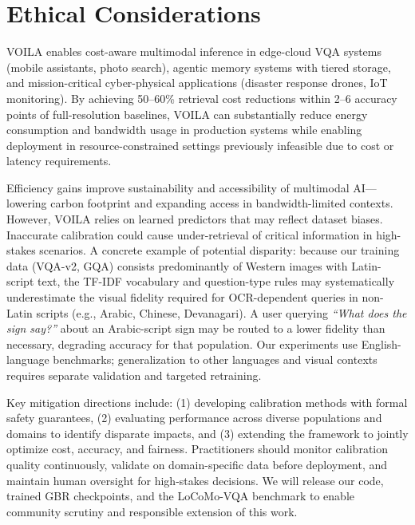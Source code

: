\section*{Ethical Considerations}

\textsc{VOILA} enables cost-aware multimodal inference in edge-cloud VQA systems (mobile assistants, photo search), agentic memory systems with tiered storage, and mission-critical cyber-physical applications (disaster response drones, IoT monitoring).
By achieving 50--60\% retrieval cost reductions within 2--6 accuracy points of full-resolution baselines, \textsc{VOILA} can substantially reduce energy consumption and bandwidth usage in production systems while enabling deployment in resource-constrained settings previously infeasible due to cost or latency requirements.

Efficiency gains improve sustainability and accessibility of multimodal AI---lowering carbon footprint and expanding access in bandwidth-limited contexts.
However, \textsc{VOILA} relies on learned predictors that may reflect dataset biases.
Inaccurate calibration could cause under-retrieval of critical information in high-stakes scenarios.
A concrete example of potential disparity: because our training data (VQA-v2, GQA) consists predominantly of Western images with Latin-script text, the TF-IDF vocabulary and question-type rules may systematically underestimate the visual fidelity required for OCR-dependent queries in non-Latin scripts (e.g., Arabic, Chinese, Devanagari).
A user querying \emph{``What does the sign say?''} about an Arabic-script sign may be routed to a lower fidelity than necessary, degrading accuracy for that population.
Our experiments use English-language benchmarks; generalization to other languages and visual contexts requires separate validation and targeted retraining.

Key mitigation directions include: (1) developing calibration methods with formal safety guarantees, (2) evaluating performance across diverse populations and domains to identify disparate impacts, and (3) extending the framework to jointly optimize cost, accuracy, and fairness.
Practitioners should monitor calibration quality continuously, validate on domain-specific data before deployment, and maintain human oversight for high-stakes decisions.
We will release our code, trained GBR checkpoints, and the LoCoMo-VQA benchmark to enable community scrutiny and responsible extension of this work.